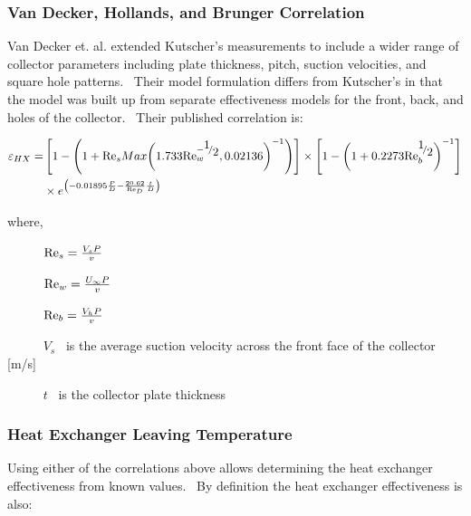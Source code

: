 \subsubsection{Van Decker, Hollands, and Brunger Correlation}\label{van-decker-hollands-and-brunger-correlation}

Van Decker et. al. extended Kutscher's measurements to include a wider range of collector parameters including plate thickness, pitch, suction velocities, and square hole patterns.~ Their model formulation differs from Kutscher's in that the model was built up from separate effectiveness models for the front, back, and holes of the collector.~ Their published correlation is:

\begin{equation}
\begin{split}
{\varepsilon_{HX}} =& \left[ {1 - \left( {1 + {{{\mathop{\rm Re}\nolimits} }_s}Max{{\left( {1.733{\mathop{\rm Re}\nolimits}_w^{ - {\raise0.7ex\hbox{1} \!\mathord{\left/ {\vphantom {1 2}}\right.}\!\lower0.7ex\hbox{2}}},0.02136} \right)}^{ - 1}}} \right)} \right] \times \left[ {1 - {{\left( {1 + 0.2273{\mathop{\rm Re}\nolimits}_b^{{\raise0.7ex\hbox{1} \!\mathord{\left/ {\vphantom {1 2}}\right.}\!\lower0.7ex\hbox{2}}}} \right)}^{ - 1}}} \right] \\
&\times {e^{\left( { - 0.01895\frac{P}{D} - \frac{{20.62}}{{{{{\mathop{\rm Re}\nolimits} }_D}}}\frac{t}{D}} \right)}}
\end{split}
\end{equation}

where,

~~~~~ \({{\mathop{\rm Re}\nolimits}_s} = \frac{{{V_s}P}}{v}\)

~~~~~ \({{\mathop{\rm Re}\nolimits}_w} = \frac{{{U_\infty }P}}{v}\)

~~~~~ \({{\mathop{\rm Re}\nolimits}_b} = \frac{{{V_h}P}}{v}\)

~~~~~ \({V_s}\) ~is the average suction velocity across the front face of the collector {[}m/s{]}

~~~~~ \(t\) ~is the collector plate thickness

\subsubsection{Heat Exchanger Leaving Temperature}\label{heat-exchanger-leaving-temperature}

Using either of the correlations above allows determining the heat exchanger effectiveness from known values.~ By definition the heat exchanger effectiveness is also:

